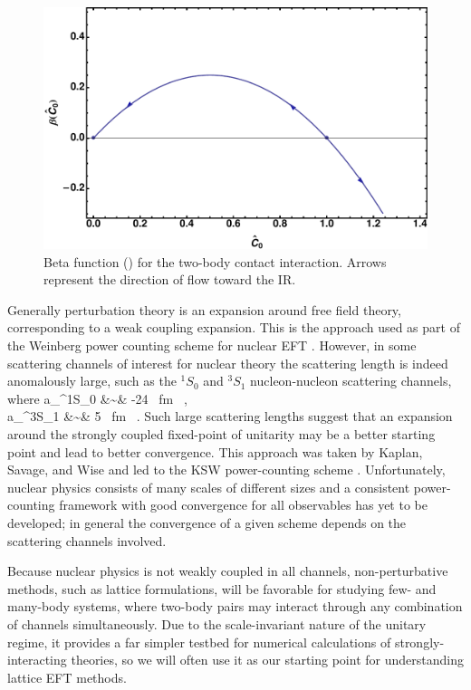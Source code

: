 \begin{figure}
\begin{center}
\includegraphics[width=0.5\linewidth]{Chapter5-figures/beta.pdf}
\end{center}
\caption{\label{fig:beta}Beta function () for the two-body contact interaction. Arrows represent the direction of flow toward the IR.}
\end{figure}

Generally perturbation theory is an expansion around free field theory, corresponding to a weak coupling expansion. This is the approach used as part of the Weinberg power counting scheme for nuclear EFT \cite{Weinberg:1990rz,Weinberg:1991um}. However, in some scattering channels of interest for nuclear theory the scattering length is indeed anomalously large, such as the $^1S_0$ and $^3S_1$ nucleon-nucleon scattering channels, where
\beq
a_{^1S_0} &\sim& -24 \mbox{ fm} \ , \\
a_{^3S_1} &\sim& 5 \mbox{ fm} \ .
\eeq
Such large scattering lengths suggest that an expansion around the strongly coupled fixed-point of unitarity may be a better starting point and lead to better convergence. This approach was taken by Kaplan, Savage, and Wise and led to the KSW power-counting scheme \cite{Kaplan:1998we,Kaplan:1998tg,Kaplan:1996xu}. Unfortunately, nuclear physics consists of many scales of different sizes and a consistent power-counting framework with good convergence for all observables has yet to be developed; in general the convergence of a given scheme depends on the scattering channels involved. 

Because nuclear physics is not weakly coupled in all channels, non-perturbative methods, such as lattice formulations, will be favorable for studying few- and many-body systems, where two-body pairs may interact through any combination of channels simultaneously. Due to the scale-invariant nature of the unitary regime, it provides a far simpler testbed for numerical calculations of strongly-interacting theories, so we will often use it as our starting point for understanding lattice EFT methods. 

